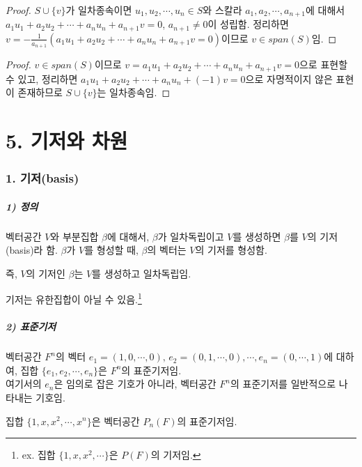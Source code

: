 \begin{proof}
$S \cup \{ v \}$가 일차종속이면 $u_1,u_2, \cdots ,u_n \in S$와 스칼라 $a_1,a_2, \cdots ,a_{n+1}$에 대해서 $a_1u_1+a_2u_2+ \cdots +a_nu_n+a_{n+1}v=0$, $a_{n+1} \not= 0$이 성립함. 정리하면 $v = - \frac{1}{a_{n+1}}(a_1u_1+a_2u_2+ \cdots +a_nu_n+a_{n+1}v=0)$이므로 $v \in span(S)$임.
\end{proof}

\begin{proof}
$v \in span(S)$이므로 $v = a_1u_1+a_2u_2+ \cdots +a_nu_n+a_{n+1}v=0$으로 표현할 수 있고, 정리하면 $a_1u_1+a_2u_2+ \cdots +a_nu_n+(-1)v=0$으로 자명적이지 않은 표현이 존재하므로 $S \cup \{ v \}$는 일차종속임.
\end{proof}


\newpage


\part*{5. 기저와 차원}

\section*{1. 기저(basis)}

\subsubsection*{1) 정의\\}
\begin{DEF}
벡터공간 $V$와 부분집합 $\beta$에 대해서, $\beta$가 일차독립이고 $V$를 생성하면 $\beta$를 $V$의 기저(basis)라 함. $\beta$가 $V$를 형성할 때, $\beta$의 벡터는 $V$의 기저를 형성함.
\end{DEF}

즉, $V$의 기저인 $\beta$는 $V$를 생성하고 일차독립임.

기저는 유한집합이 아닐 수 있음.\footnote{ex. 집합 $\{1,x,x^2, \cdots \}$은 $P(F)$의 기저임.}


\subsubsection*{2) 표준기저}
벡터공간 $F^n$의 벡터 $e_1=(1,0, \cdots ,0),\,e_2=(0,1, \cdots ,0), \cdots ,e_n=(0, \cdots ,1)$에 대하여, 집합 $\{e_1,e_2, \cdots ,e_n\}$은 $F^n$의 표준기저임.\\
여기서의 $e_n$은 임의로 잡은 기호가 아니라, 벡터공간 $F^n$의 표준기저를 일반적으로 나타내는 기호임.

집합 $\{1,x,x^2, \cdots ,x^n\}$은 벡터공간 $P_n(F)$의 표준기저임.

